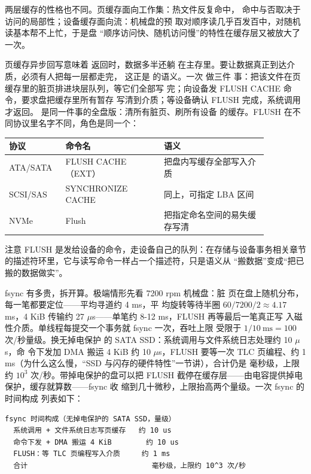 两层缓存的性格也不同。页缓存面向工作集：热文件反复命中，
命中与否取决于访问的局部性；设备缓存面向流：机械盘的预
取对顺序读几乎百发百中，对随机读基本帮不上忙，于是盘
“顺序访问快、随机访问慢”的特性在缓存层又被放大了一次。

页缓存异步回写意味着  返回时，数据多半还躺
在主存里。要让数据真正到达介质，必须有人把每一层都走完，
这正是  的语义。一次  做三件
事：把该文件在页缓存里的脏页排进块层队列，等它们全部写
完；向设备发 FLUSH CACHE 命令，要求盘把缓存里所有暂存
写清到介质；等设备确认 FLUSH 完成，系统调用才返回。
 是同一件事的全盘版：清所有脏页、刷所有设备
的缓存。FLUSH 在不同协议里名字不同，角色是同一个：

\begin{longtable}{L{0.16\linewidth}L{0.34\linewidth}L{0.36\linewidth}}
\toprule
协议 & 命令名 & 语义 \\
\midrule
ATA/SATA & FLUSH CACHE（EXT） & 把盘内写缓存全部写入介质 \\\tablerowrule
SCSI/SAS & SYNCHRONIZE CACHE & 同上，可指定 LBA 区间 \\\tablerowrule
NVMe & Flush & 把指定命名空间的易失缓存写清 \\
\bottomrule
\end{longtable}

注意 FLUSH 是发给设备的命令，走设备自己的队列：在存储与设备事务相关章节
的描述符环里，它与读写命令一样占一个描述符，只是语义从
“搬数据”变成“把已搬的数据做实”。

fsync 有多贵，拆开算。极端情形先看 7200 rpm 机械盘：脏
页在盘上随机分布，每一笔都要定位——平均寻道约 4 ms，平
均旋转等待半圈 $60/7200/2\approx4.17$ ms，4 KiB 传输约
27 $\mu$s——单笔约 8-12 ms，FLUSH 再等最后一笔真正写
入磁性介质。单线程每提交一个事务就 fsync 一次，吞吐上限
受限于 $1/10\ \mathrm{ms}=100$ 次/秒量级。换无掉电保护
的 SATA SSD：系统调用与文件系统日志处理约 10 $\mu$s，命
令下发加 DMA 搬运 4 KiB 约 10 $\mu$s，FLUSH 要等一次
TLC 页编程、约 1 ms（为什么这么慢，“SSD 与闪存的硬件特性”一节讲），合计仍是
毫秒级，上限约 $10^{3}$ 次/秒。带掉电保护的盘可以把
FLUSH 截停在缓存层——由电容提供掉电保护，缓存就算数——fsync 收
缩到几十微秒，上限抬高两个量级。一次 fsync 的时间构成
列表如下：

\begin{lstlisting}
fsync 时间构成（无掉电保护的 SATA SSD，量级）
  系统调用 + 文件系统日志写页缓存   约 10 us
  命令下发 + DMA 搬运 4 KiB        约 10 us
  FLUSH：等 TLC 页编程写入介质     约 1 ms
  合计                             毫秒级，上限约 10^3 次/秒
\end{lstlisting}

